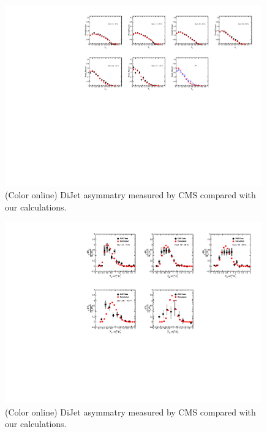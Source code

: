 \documentclass[reprint,amsmath,amssymb,aps,prc,showpacs,showkeys]{revtex4-1}
\begin{document}
\begin{figure}
\includegraphics[width=0.99\textwidth]{Figures/Fig_Asym_DiJet_Centrality.pdf}
\caption{(Color online) DiJet asymmatry measured by CMS compared with our calculations.}
\label{Fig:DiJetAsymPt}
\end{figure}



\begin{figure}
\includegraphics[width=0.99\textwidth]{Figures/Fig_XJ_GammaJet_Centrality.pdf}
\caption{(Color online) DiJet asymmatry measured by CMS compared with our calculations.}
\label{Fig:DiJetAsymPt}
\end{figure}
\end{document}

